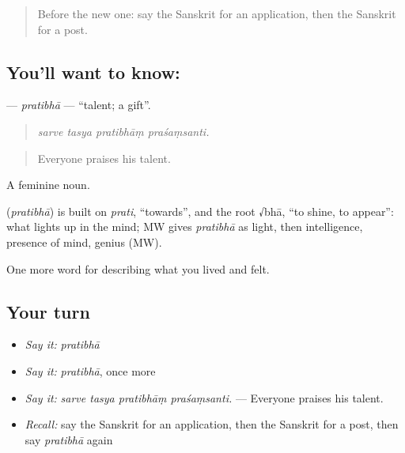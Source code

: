 \label{lesson:SA-C504-pratibha}



\begin{quote}
Before the new one: say the Sanskrit for an application, then the Sanskrit for a post.
\end{quote}

\subsection*{You'll want to know: }
\textbf{} — \emph{pratibhā} — \textquotedblleft{}talent; a gift\textquotedblright{}.

\begin{quote}
   
\end{quote}

\begin{quote}
\emph{sarve tasya pratibhāṃ praśaṃsanti.}
\end{quote}

\begin{quote}
Everyone praises his talent.
\end{quote}

A feminine noun.

\begin{cousinweb}
\textbf{} (\emph{pratibhā}) is built on \emph{prati}, \textquotedblleft{}towards\textquotedblright{}, and the root √bhā, \textquotedblleft{}to shine, to appear\textquotedblright{}: what lights up in the mind; MW gives \emph{pratibhā} as light, then intelligence, presence of mind, genius (MW).
\end{cousinweb}

\begin{grammarlens}[title={What you've built}]
One more word for describing what you lived and felt.
\end{grammarlens}

\subsection*{Your turn}
\begin{itemize}
\raggedright
  \item \emph{Say it:} \emph{pratibhā}
  \item \emph{Say it:} \emph{pratibhā}, once more
  \item \emph{Say it:} \emph{sarve tasya pratibhāṃ praśaṃsanti.} — Everyone praises his talent.
  \item \emph{Recall:} say the Sanskrit for an application, then the Sanskrit for a post, then say \emph{pratibhā} again
\end{itemize}

